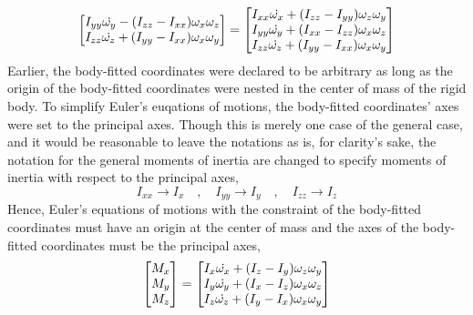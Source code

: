 \documentclass[class=report, 12pt, crop=false]{standalone}
\begin{document}
\begin{center}
$$\begin{bmatrix}
I_{yy}\dot{\omega_y} - (I_{zz} - I_{xx})\omega_x\omega_z\\
I_{zz}\dot{\omega_z} + (I_{yy} - I_{xx})\omega_x\omega_y
\end{bmatrix} = \begin{bmatrix} 
I_{xx}\dot{\omega_x} + (I_{zz} - I_{yy})\omega_z\omega_y\\
I_{yy}\dot{\omega_y} + (I_{xx} - I_{zz})\omega_x\omega_z\\
I_{zz}\dot{\omega_z} + (I_{yy} - I_{xx})\omega_x\omega_y
\end{bmatrix}$$
Earlier, the body-fitted coordinates were declared to be arbitrary as long as the origin of the body-fitted coordinates were nested in the center of mass of the rigid body. To simplify Euler's euqations of motions, the body-fitted coordinates' axes were set to the principal axes. Though this is merely one case of the general case, and it would be reasonable to leave the notations as is, for clarity's sake, the notation for the general moments of inertia are changed to specify moments of inertia with respect to the principal axes,
$$I_{xx}\to I_x \quad,\quad I_{yy}\to I_y \quad,\quad I_{zz}\to I_z$$
Hence, Euler's equations of motions with the constraint of the body-fitted coordinates must have an origin at the center of mass and the axes of the body-fitted coordinates must be the principal axes,
$$\begin{bmatrix}M_x \\ M_y \\ M_z\end{bmatrix} = \begin{bmatrix} 
I_{x}\dot{\omega_x} + (I_{z} - I_{y})\omega_z\omega_y\\
I_{y}\dot{\omega_y} + (I_{x} - I_{z})\omega_x\omega_z\\
I_{z}\dot{\omega_z} + (I_{y} - I_{x})\omega_x\omega_y
\end{bmatrix}$$



\end{center}
\end{document}
